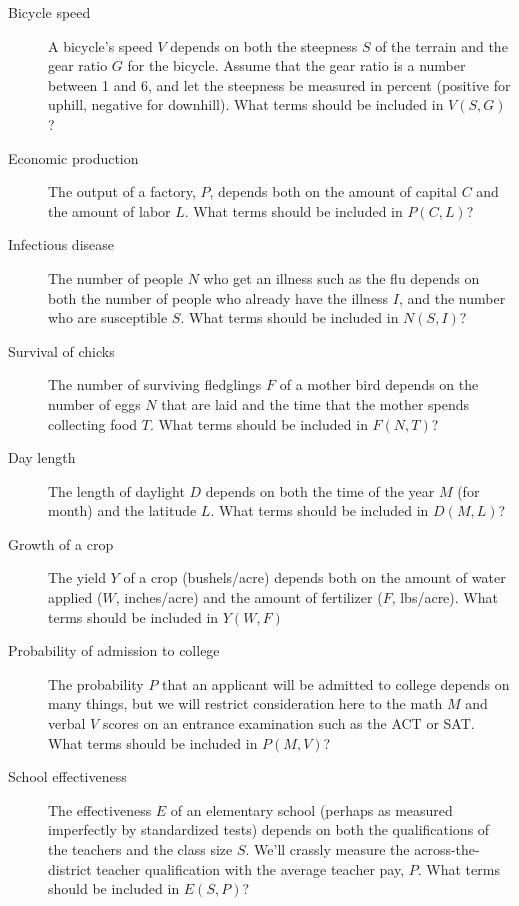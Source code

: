 \begin{description}

\item[Bicycle speed] A bicycle's speed $V$ depends on both the
  steepness $S$ of the terrain and the gear ratio $G$ for the bicycle.
  Assume that the gear ratio is a number between 1 and 6, and let the
  steepness be measured in percent (positive for uphill, negative for
  downhill).  What terms should be included in $V(S,G)$?

\item[Economic production] The output of a factory, $P$, depends both
  on the amount of capital $C$ and the amount of labor $L$.  What
  terms should be included in $P(C,L)$?

\item[Infectious disease] The number of people $N$ who get an illness such
  as the flu depends on both the number of people who already have the
  illness $I$, and the number who are susceptible $S$.  What terms
  should be included in $N(S,I)$?

\item[Survival of chicks] The number of surviving fledglings $F$ of a
  mother bird depends on the number of eggs $N$ that are laid and the time
  that the mother spends collecting food $T$.  What terms should be
  included in $F(N,T)$?

\item[Day length] The length of daylight $D$ depends on both the time
  of the year $M$ (for month) and the latitude $L$.  What terms should
  be included in $D(M,L)$?

\item[Growth of a crop] The yield $Y$ of a crop (bushels/acre) depends
  both on the amount of water applied ($W$, inches/acre) and the amount of
  fertilizer ($F$, lbs/acre).  What terms should be included in
  $Y(W,F)$

\item[Probability of admission to college]  The probability $P$ that an
  applicant will be admitted to college depends on many things, but we
  will restrict consideration here to the math $M$ and verbal $V$
  scores on an entrance examination such as the ACT or SAT.  What
  terms should be included in $P(M,V)$?

\item[School effectiveness]  The effectiveness $E$ of an elementary
  school (perhaps as measured imperfectly by standardized tests)
  depends on both the qualifications of the teachers and the class
  size $S$.  We'll crassly measure the across-the-district teacher
  qualification with the average teacher pay, $P$.  What terms should
  be included in $E(S,P)$?

\end{description}


